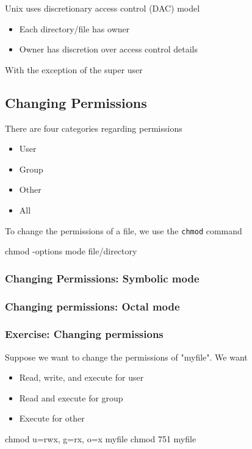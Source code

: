 \documentclass{report}
\begin{document}
    \pagebreak 
    \bigbreak \noindent 
    Unix uses discretionary access control (DAC) model
    \begin{itemize}
        \item Each directory/file has owner
        \item Owner has discretion over access control details
    \end{itemize}
    With the exception of the super user

    \bigbreak \noindent 
    \subsection{Changing Permissions}
    \bigbreak \noindent 
    There are four categories regarding permissions 
    \begin{itemize}
        \item User 
        \item Group
        \item Other
        \item All
    \end{itemize}
    \bigbreak \noindent 
    To change the permissions of a file, we use the \texttt{chmod} command
    \bigbreak \noindent 
    \begin{bashcode}
    chmod -options mode file/directory
    \end{bashcode}
    \bigbreak \noindent 
    \subsubsection{Changing Permissions: Symbolic mode}
    \bigbreak \noindent 
    \bigbreak \noindent  \bigbreak \noindent 



    \pagebreak 
    \subsubsection{Changing permissions: Octal mode}

    \bigbreak \noindent 
    \subsubsection{Exercise: Changing permissions}
    \bigbreak \noindent 
    Suppose we want to change the permissions of "myfile". We want
    \begin{itemize}
        \item Read, write, and execute for user 
        \item Read and execute for group
        \item Execute for other
    \end{itemize}
    \bigbreak \noindent 
    \begin{bashcode}
    chmod u=rwx, g=rx, o=x myfile
    chmod 751 myfile
    \end{bashcode}
\end{document}
